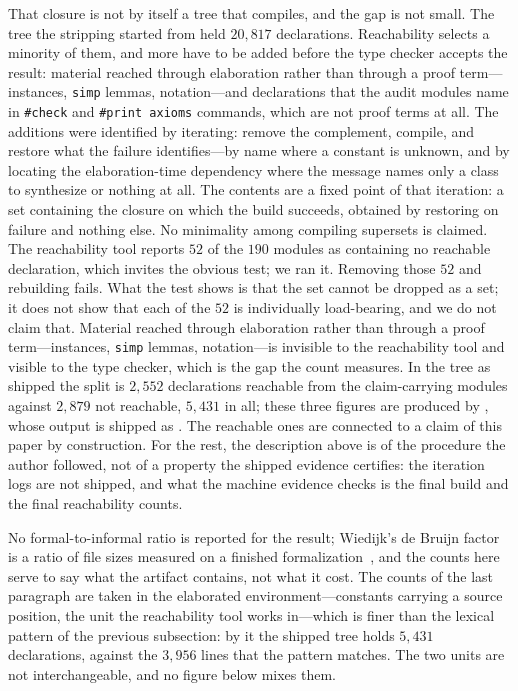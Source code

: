 \documentclass[11pt]{article}
\theoremstyle{definition}
\theoremstyle{remark}
\begin{document}
That closure is not by itself a tree that compiles, and the gap is not small.  The tree the stripping started from held $20{,}817$ declarations.  Reachability selects a minority of them, and more have to be added before the type checker accepts the result: material reached through elaboration rather than through a proof term---instances, \texttt{simp} lemmas, notation---and declarations that the audit modules name in \texttt{\#check} and \texttt{\#print axioms} commands, which are not proof terms at all.  The additions were identified by iterating: remove the complement, compile, and restore what the failure identifies---by name where a constant is unknown, and by locating the elaboration-time dependency where the message names only a class to synthesize or nothing at all.  The contents are a fixed point of that iteration: a set containing the closure on which the build succeeds, obtained by restoring on failure and nothing else.  No minimality among compiling supersets is claimed.  The reachability tool reports $52$ of the $190$ modules as containing no reachable declaration, which invites the obvious test; we ran it.  Removing those $52$ and rebuilding fails.  What the test shows is that the set cannot be dropped as a set; it does not show that each of the $52$ is individually load-bearing, and we do not claim that.  Material reached through elaboration rather than through a proof term---instances, \texttt{simp} lemmas, notation---is invisible to the reachability tool and visible to the type checker, which is the gap the count measures.  In the tree as shipped the split is $2{,}552$ declarations reachable from the claim-carrying modules against $2{,}879$ not reachable, $5{,}431$ in all; these three figures are produced by , whose output is shipped as .  The reachable ones are connected to a claim of this paper by construction.  For the rest, the description above is of the procedure the author followed, not of a property the shipped evidence certifies: the iteration logs are not shipped, and what the machine evidence checks is the final build and the final reachability counts.

No formal-to-informal ratio is reported for the result; Wiedijk's de Bruijn factor is a ratio of file sizes measured on a finished formalization~\cite{wiedijk-2000}, and the counts here serve to say what the artifact contains, not what it cost.  The counts of the last paragraph are taken in the elaborated environment---constants carrying a source position, the unit the reachability tool works in---which is finer than the lexical pattern of the previous subsection: by it the shipped tree holds $5{,}431$ declarations, against the $3{,}956$ lines that the pattern matches.  The two units are not interchangeable, and no figure below mixes them.
\end{document}

